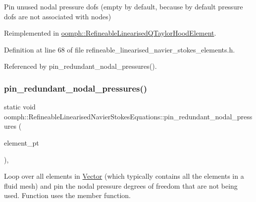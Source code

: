 Pin unused nodal pressure dofs (empty by default, because by default pressure dofs are not associated with nodes) 



Reimplemented in \hyperlink{classoomph_1_1RefineableLinearisedQTaylorHoodElement_a9f9e9989fcfca1fba2b5ba1778897b4a}{oomph\+::\+Refineable\+Linearised\+Q\+Taylor\+Hood\+Element}.



Definition at line 68 of file refineable\+\_\+linearised\+\_\+navier\+\_\+stokes\+\_\+elements.\+h.



Referenced by pin\+\_\+redundant\+\_\+nodal\+\_\+pressures().

\mbox{\label{classoomph_1_1RefineableLinearisedNavierStokesEquations_a3e780af67f06310eaf4417fc3f7b22dd}} 
\subsubsection{\texorpdfstring{pin\+\_\+redundant\+\_\+nodal\+\_\+pressures()}{pin\_redundant\_nodal\_pressures()}}
{\footnotesize\ttfamily static void oomph\+::\+Refineable\+Linearised\+Navier\+Stokes\+Equations\+::pin\+\_\+redundant\+\_\+nodal\+\_\+pressures (\begin{DoxyParamCaption}\item[{const \hyperlink{classoomph_1_1Vector}{Vector}$<$ \hyperlink{classoomph_1_1GeneralisedElement}{Generalised\+Element} $\ast$$>$ \&}]{element\+\_\+pt }\end{DoxyParamCaption})\hspace{0.3cm}{\ttfamily [inline]}, {\ttfamily [static]}}



Loop over all elements in \hyperlink{classoomph_1_1Vector}{Vector} (which typically contains all the elements in a fluid mesh) and pin the nodal pressure degrees of freedom that are not being used. Function uses the member function. 


